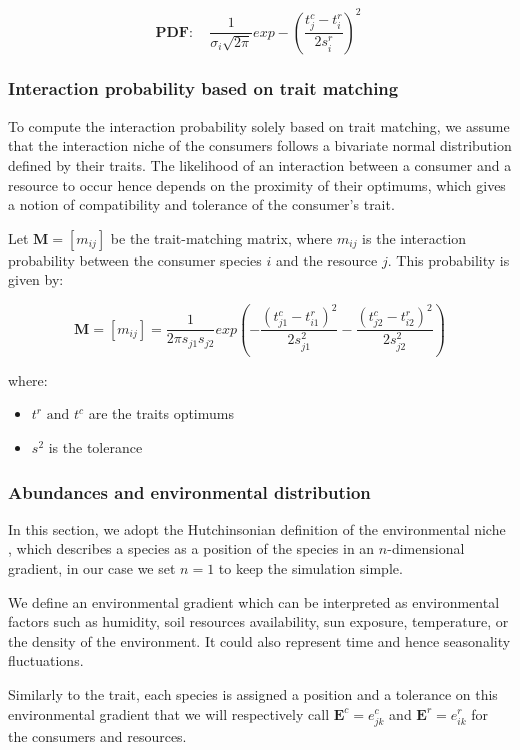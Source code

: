 $$
    \mathbf{PDF:} \quad \frac{1}{\sigma_i\sqrt{2\pi}} exp -\left(\frac{t_j^c-t_i^r}{2s_i^r}\right)^{\!2}\
$$

\subsubsection{Interaction probability based on trait matching}

To compute the interaction probability solely based on trait matching, we assume that the interaction niche of the consumers follows a bivariate normal distribution defined by their traits. The likelihood of an interaction between a consumer and a resource to occur hence depends on the proximity of their optimums, which gives a notion of compatibility and tolerance of the consumer's trait.

Let $\mathbf{M} = [m_{ij}]$ be the trait-matching matrix, where $m_{ij}$ is the interaction probability between the consumer species $i$ and the resource $j$. This probability is given by:

$$
    \mathbf{M} = [m_{ij}]=\frac{1}{2\pi s_{j1}s_{j2}} exp\left(-\frac{(t^c_{j1} - t^r_{i1})^2}{2s^2_{j1}} - \frac{(t^c_{j2} - t^r_{i2})^2}{2s^2_{j2}}\right)
$$

where:
\begin{itemize}
    \item $t^r \text{ and }t^c$ are the traits optimums
    \item $s^2$ is the tolerance
\end{itemize}


\subsubsection{Abundances and environmental distribution}



In this section, we adopt the  Hutchinsonian definition of the environmental niche \citep{hutchinson_concluding_1957}, which describes a species as a position of the species in an $n$-dimensional gradient, in our case we set $n=1$ to keep the simulation simple.

We define an environmental gradient which can be interpreted as environmental factors such as humidity, soil resources availability, sun exposure, temperature, or the density of the environment. It could also represent time and hence seasonality fluctuations.

Similarly to the trait, each species is assigned a position and a tolerance on this environmental gradient that we will respectively call $\mathbf{E}^c = e_{jk}^c$ and $\mathbf{E}^r = e_{ik}^r$ for the consumers and resources.

